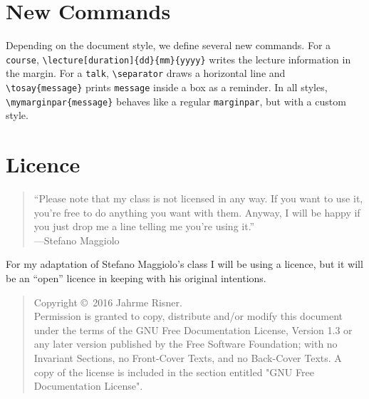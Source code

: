 \documentclass[english,course,twocolumn]{notes}
\begin{document}
\section{New Commands}

Depending on the document style, we define several new commands.
For a \verb|course|, \verb|\lecture[duration]{dd}{mm}{yyyy}| writes the lecture information in the margin.
For a \verb|talk|, \verb|\separator| draws a horizontal line and \verb|\tosay{message}| prints \verb|message| inside a box as a reminder.
In all styles, \verb|\mymarginpar{message}| behaves like a regular \verb|marginpar|, but with a custom style.

\section{Licence}

\begin{quote}
``Please note that my class is not licensed in any way.
If you want to use it, you're free to do anything you want with them.
Anyway, I will be happy if you just drop me a line telling me you're using it.''
\\
---Stefano Maggiolo
\end{quote}

For my adaptation of Stefano Maggiolo's class I will be using a licence, but it will be an ``open'' licence in keeping with his original intentions.

\begin{quote}
Copyright \copyright\ 2016 Jahrme Risner.\\
Permission is granted to copy, distribute and/or modify this document
under the terms of the GNU Free Documentation License, Version 1.3
or any later version published by the Free Software Foundation;
with no Invariant Sections, no Front-Cover Texts, and no Back-Cover Texts.
A copy of the license is included in the section entitled "GNU
Free Documentation License".
\end{quote}
\end{document}
